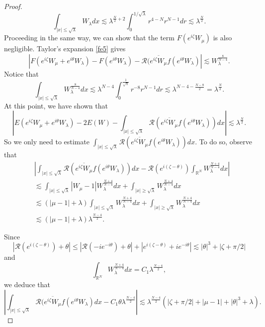 \documentclass[a4paper,two-side,10pt]{amsart}
\newcommand{\R}{\mathbb{R}}
\numberwithin{equation}{section}
\begin{document}
\begin{proof}
$$\int_{|x|\leq \sqrt{\lambda}} W_\lambda dx \lesssim \lambda^{\frac{N}{2} +2} \int_0^{1/\sqrt{\lambda}} r^{4-N}r^{N-1} dr \lesssim \lambda^{\frac{N}{2}} .$$
Proceeding in the same way, we can show that the term $F(e^{i\zeta}W_\mu)$ is also negligible. Taylor's expansion \eqref{fe5} gives
$$|F(e^{i\zeta} W_\mu + e^{i\theta} W_\lambda) - F (e^{i\theta} W_\lambda) -\mathcal{R} (  \overline{e^{i\zeta} W_\mu } f(e^{i\theta} W_\lambda) |\lesssim W_\lambda^{\frac{8}{N-4}}.$$
Notice that
$$\int_{|x|\leq \sqrt{\lambda}} W_\lambda^{\frac{8}{N-4}} dx \lesssim \lambda^{N-4} \int_0^{\frac{1}{\sqrt{\lambda}}}  r^{-8} r^{N-1} dr \lesssim \lambda^{N-4 -\frac{N-8}{2}}=\lambda^{\frac{N}{2}}.$$
At this point, we have shown that
$$\left| E(e^{i\zeta} W_\mu +e^{i\theta} W_\lambda )- 2E(W) - \int_{|x|\leq \sqrt{\lambda}} \mathcal{R} (  \overline{e^{i\zeta} W_\mu } f(e^{i\theta} W_\lambda))  dx \right|\lesssim \lambda^{\frac{N}{2}}. $$
So we only need to estimate $ \int_{|x|\leq \sqrt{\lambda}} \mathcal{R} (  \overline{e^{i\zeta} W_\mu } f(e^{i\theta} W_\lambda))  dx $. To do so, observe that
\begin{align*}
&\left|\int_{|x|\leq \sqrt{\lambda}} \mathcal{R} ( \overline{e^{i\zeta} W_\mu } f(e^{i\theta} W_\lambda ) )dx - \mathcal{R} (e^{i(\zeta - \theta)})\int_{\R^N} W_\lambda^{\frac{N+4}{N-4}} dx \right|\\
&\lesssim \int_{|x|\leq \sqrt{\lambda}} |W_\mu -1| W_\lambda^{\frac{N+4}{N-4}} dx + \int_{|x|\geq \sqrt{\lambda}} W_\lambda^{\frac{N+4}{N-4}} dx \\
&\lesssim (|\mu -1|+\lambda) \int_{|x|\leq \sqrt{\lambda}} W_\lambda^{\frac{N+4}{N-4}} dx +\int_{|x|\geq \sqrt{\lambda}} W_\lambda^{\frac{N+4}{N-4}} dx\\
&\lesssim  (|\mu -1|+\lambda) \lambda^{\frac{N-4}{2}}.
\end{align*}

Since
$$|\mathcal{R} (e^{i (\zeta -\theta )} )+\theta| \leq |\mathcal{R} (-i e^{-i\theta} ) +\theta|+ |e^{i(\zeta -\theta) } +i e^{-i\theta}|\lesssim  |\theta|^3 +|\zeta + \pi /2|$$
and
$$\int_{\R^N} W_\lambda^{\frac{N+4}{N-4}} dx = C_1 \lambda^{\frac{N-4}{2}},$$
we deduce that
\begin{equation}
\label{missingeq}
\left|\int_{|x|\leq \sqrt{\lambda}} \mathcal{R} ( \overline{e^{i\zeta} W_\mu } f(e^{i\theta} W_\lambda ) dx - C_1 \theta \lambda^{\frac{N-4}{2}} \right|\lesssim \lambda^{\frac{N-4}{2}} (|\zeta +\pi /2| +|\mu -1| +|\theta|^3 +\lambda). 
\end{equation}
\end{proof}
\end{document}
